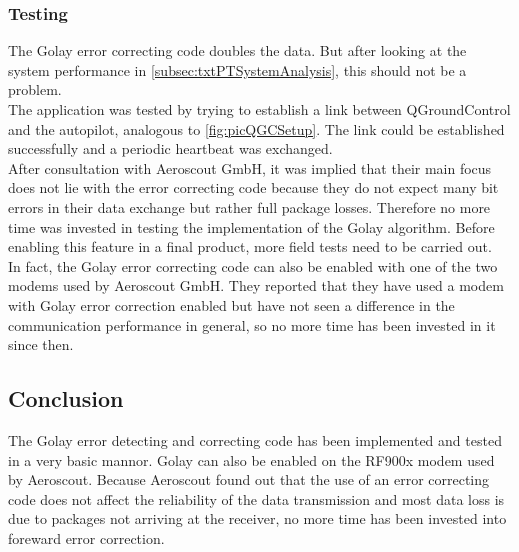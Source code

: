 \subsubsection{Testing}
The Golay error correcting code doubles the data. But after looking at the system performance in \autoref{subsec:txtPTSystemAnalysis}, this should not be a problem.\\
The application was tested by trying to establish a link between QGroundControl and the autopilot, analogous to \autoref{fig:picQGCSetup}. The link could be established successfully and a periodic heartbeat was exchanged.\\
After consultation with Aeroscout GmbH, it was implied that their main focus does not lie with the error correcting code because they do not expect many bit errors in their data exchange but rather full package losses. Therefore no more time was invested in testing the implementation of the Golay algorithm. Before enabling this feature in a final product, more field tests need to be carried out.\\
In fact, the Golay error correcting code can also be enabled with one of the two modems used by Aeroscout GmbH. They reported that they have used a modem with Golay error correction enabled but have not seen a difference in the communication performance in general, so no more time has been invested in it since then. 
%
\subsection{Conclusion}
The Golay error detecting and correcting code has been implemented and tested in a very basic mannor. Golay can also be enabled on the RF900x modem used by Aeroscout. Because Aeroscout found out that the use of an error correcting code does not affect the reliability of the data transmission and most data loss is due to packages not arriving at the receiver, no more time has been invested into foreward error correction.
%
%
%
